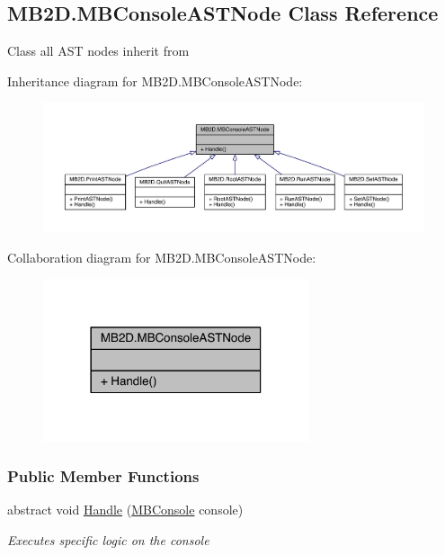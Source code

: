 \hypertarget{class_m_b2_d_1_1_m_b_console_a_s_t_node}{}\subsection{M\+B2\+D.\+M\+B\+Console\+A\+S\+T\+Node Class Reference}
\label{class_m_b2_d_1_1_m_b_console_a_s_t_node}


Class all A\+ST nodes inherit from  




Inheritance diagram for M\+B2\+D.\+M\+B\+Console\+A\+S\+T\+Node\+:
\nopagebreak
\begin{figure}[H]
\begin{center}
\leavevmode
\includegraphics[width=350pt]{class_m_b2_d_1_1_m_b_console_a_s_t_node__inherit__graph}
\end{center}
\end{figure}


Collaboration diagram for M\+B2\+D.\+M\+B\+Console\+A\+S\+T\+Node\+:
\nopagebreak
\begin{figure}[H]
\begin{center}
\leavevmode
\includegraphics[width=222pt]{class_m_b2_d_1_1_m_b_console_a_s_t_node__coll__graph}
\end{center}
\end{figure}
\subsubsection*{Public Member Functions}
\begin{DoxyCompactItemize}
\item 
abstract void \hyperlink{class_m_b2_d_1_1_m_b_console_a_s_t_node_aa70a49e61ab623698af4ed8fda4ebbf5}{Handle} (\hyperlink{class_m_b2_d_1_1_m_b_console}{M\+B\+Console} console)
\begin{DoxyCompactList}\small\item\em Executes specific logic on the console \end{DoxyCompactList}\end{DoxyCompactItemize}


